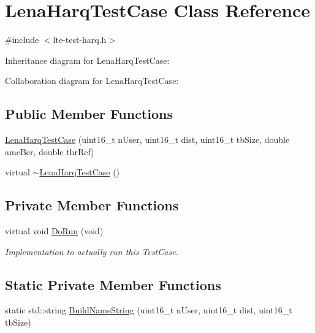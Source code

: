 \hypertarget{classLenaHarqTestCase}{}\section{Lena\+Harq\+Test\+Case Class Reference}
\label{classLenaHarqTestCase}


{\ttfamily \#include $<$lte-\/test-\/harq.\+h$>$}



Inheritance diagram for Lena\+Harq\+Test\+Case\+:


Collaboration diagram for Lena\+Harq\+Test\+Case\+:
\subsection*{Public Member Functions}
\begin{DoxyCompactItemize}
\item 
\hyperlink{classLenaHarqTestCase_a986096c11ac19b92c8833e4fa74eb93c}{Lena\+Harq\+Test\+Case} (uint16\+\_\+t n\+User, uint16\+\_\+t dist, uint16\+\_\+t tb\+Size, double amc\+Ber, double thr\+Ref)
\item 
virtual \hyperlink{classLenaHarqTestCase_ae3bc34acf903a0c5a08248e66dea318e}{$\sim$\+Lena\+Harq\+Test\+Case} ()
\end{DoxyCompactItemize}
\subsection*{Private Member Functions}
\begin{DoxyCompactItemize}
\item 
virtual void \hyperlink{classLenaHarqTestCase_a77a86faca2ff6021e971516d82ea0533}{Do\+Run} (void)
\begin{DoxyCompactList}\small\item\em Implementation to actually run this Test\+Case. \end{DoxyCompactList}\end{DoxyCompactItemize}
\subsection*{Static Private Member Functions}
\begin{DoxyCompactItemize}
\item 
static std\+::string \hyperlink{classLenaHarqTestCase_a6560ccf998d92aba95d60a42c060b023}{Build\+Name\+String} (uint16\+\_\+t n\+User, uint16\+\_\+t dist, uint16\+\_\+t tb\+Size)
\end{DoxyCompactItemize}
